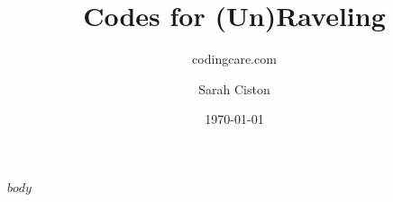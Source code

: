 \documentclass[9pt,oneside]{scrartcl}
\title{Codes for (Un)Raveling}
\subtitle{codingcare.com}
\author{Sarah Ciston}
\date{\today}
\begin{document}
\maketitle





$body$
\end{document}
